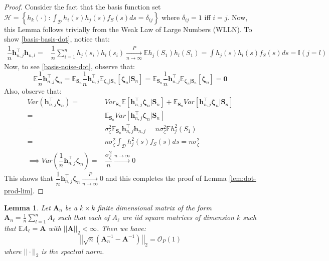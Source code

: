\documentclass[
  12pt]{article}
\newcommand{\nlim}{\xrightarrow[]{n \to \infty}}
\newcommand{\pnlim}{\xrightarrow[n \to \infty]{P}}
\newcommand{\calD}{\mathcal{D}}
\newcommand{\calH}{\mathcal{H}}
\newcommand{\bigo}{\mathcal{O}}
\newcommand{\bzet}{\boldsymbol{\zeta}}
\newcommand{\bh}{\boldsymbol{h}}
\newcommand{\bS}{\boldsymbol{S}}
\newcommand{\bA}{\boldsymbol{A}}
\newcommand{\E}{\mathbb{E}}
\newtheorem{lemma}{Lemma}
\newcommand{\bzero}{\boldsymbol{0}}
\begin{document}
\begin{proof}
    Consider the fact that the basis function set $\calH = \left\{ h_k(\cdot) : \int_{\mathcal{D}} h_i(s) h_j(s) f_S(s) ds = \delta_{ij} \right\}$ where $\delta_{ij}=1$ iff $i=j$. Now, this Lemma follows trivially from the Weak Law of Large Numbers (WLLN). To show \ref{basis-basis-dot}, notice that:
    $$
    \begin{aligned}
        \dfrac{1}{n} \bh_{n,j}^\top\bh_{n,l} = & \dfrac{1}{n} \sum_{i=1}^n h_j(s_i)h_l(s_i) \pnlim \E h_j(S_1)h_l(S_1) = \int h_j(s)h_l(s)f_S(s)ds = \mathbb{I}(j=l)
    \end{aligned}
    $$
    Now, to see \ref{basis-noise-dot}, observe that:
    $$
    \E \dfrac{1}{n} \bh_{n,j}^\top\bzet_n= \E_{\bS_n}\dfrac{1}{n}\bh_{n,j}^\top\E_{\bzet_n|\bS_n}\left[\bzet_n|\bS_n\right] = \E_{\bS_n}\dfrac{1}{n}\bh_{n,j}^\top\E_{\bzet_n|\bS_n}\left[\bzet_n\right] = \bzero 
    $$
    Also, observe that:
    $$
    \begin{aligned}
        Var\left(\bh_{n,j}^\top\bzet_n\right) = & Var_{\bS_n}\E[\bh_{n,j}^\top\bzet_n|\bS_n] + \E_{\bS_n}Var[\bh_{n,j}^\top\bzet_n|\bS_n]\\
        = & \E_{\bS_n}Var[\bh_{n,j}^\top\bzet_n|\bS_n]\\
        = & \sigma^2_{\zeta}\E_{\bS_n}\bh_{n,j}^\top\bh_{n,j} = n\sigma^2_\zeta\E h_j^2(S_1)\\
        = & n\sigma^2_\zeta\int_{\calD}h^2_j(s)f_S(s)ds = n\sigma^2_\zeta\\
        \implies Var\left(\dfrac{1}{n}\bh_{n,j}^\top\bzet_n\right) =  & \dfrac{\sigma^2_\zeta}{n} \nlim 0
    \end{aligned}
    $$
    This shows that $\dfrac{1}{n}\bh_{n,j}^\top\bzet_n \pnlim 0$ and this completes the proof of Lemma \ref{lem:dot-prod-lim}.
\end{proof}
\begin{lemma}\label{prop:tight-matrix-inv}
    Let $\bA_n$ be a $k \times k$ finite dimensional matrix of the form $\bA_n = \frac{1}{n}\sum_{l=1}^n A_\ell$ such that each of $A_\ell$ are iid square matrices of dimension $k$ such that $\E A_\ell = \bA$ with $||\bA||_2<\infty$. Then we have:
$$
\left|\left|\sqrt{n}\left(\bA_n^{-1} - \bA^{-1}\right)\right|\right|_2 = \bigo_P(1)
$$
where $||\cdot||_2$ is the spectral norm.
\end{lemma}
\end{document}
